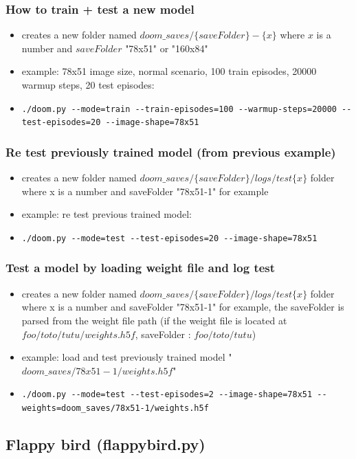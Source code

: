 \documentclass[a4paper,10pt,openany,oneside]{report}
\begin{document}
\subsubsection*{How to train + test a new model}
\begin{itemize}
	\item creates a new folder named $doom\_saves/\{saveFolder\}-\{x\}$ where $x$ is a number and $saveFolder$ "78x51" or "160x84"
	\item example: 78x51 image size, normal scenario, 100 train episodes, 20000 warmup steps, 20 test episodes: 
	\item \lstinline{./doom.py --mode=train --train-episodes=100 --warmup-steps=20000 --test-episodes=20 --image-shape=78x51}
\end{itemize}
\subsubsection*{Re test previously trained model (from previous example)}
\begin{itemize}
	\item creates a new folder named $doom\_saves/\{saveFolder\}/logs/test\{x\}$ folder where x is a number and saveFolder "78x51-1" for example
	\item example: re test previous trained model: 
	\item \lstinline{./doom.py --mode=test --test-episodes=20 --image-shape=78x51}
\end{itemize}
\newpage
\subsubsection*{Test a model by loading weight file and log test}
\begin{itemize}
	\item creates a new folder named $doom\_saves/\{saveFolder\}/logs/test\{x\}$ folder where x is a number and saveFolder "78x51-1" for example, the saveFolder is parsed from the weight file path (if the weight file is located at $foo/toto/tutu/weights.h5f$, saveFolder : $foo/toto/tutu$)
	\item  example: load and test previously trained model "$doom\_saves/78x51-1/weights.h5f$"
	\item \lstinline{./doom.py --mode=test --test-episodes=2 --image-shape=78x51 --weights=doom_saves/78x51-1/weights.h5f}
\end{itemize}
\subsection*{Flappy bird (flappybird.py)}
\end{document}
